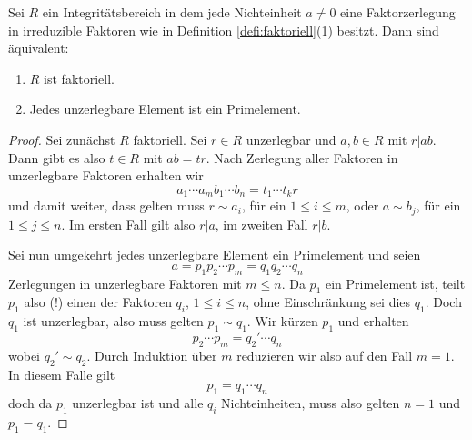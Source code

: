 \documentclass{book}
\begin{document}
\begin{prop}
    \label{prop:faktor}
    Sei $R$ ein Integritätsbereich in dem jede Nichteinheit $a \ne 0$ eine
    Faktorzerlegung in irreduzible Faktoren wie in Definition
    \ref{defi:faktoriell}(1) besitzt. Dann sind äquivalent:
    \begin{enumerate}[label=(\roman *)]
        \item $R$ ist faktoriell.
        \item Jedes unzerlegbare Element ist ein Primelement.
    \end{enumerate}
\end{prop}
\begin{proof}
    Sei zunächst $R$ faktoriell. Sei $r \in R$ unzerlegbar und $a,b \in R$ mit
    $r | ab$. Dann gibt es also $t \in R$ mit $ab = t r$. Nach Zerlegung aller
    Faktoren in unzerlegbare Faktoren erhalten wir
    \[
        a_1 \cdots a_m b_1 \cdots b_n = t_1 \cdots t_k r
    \]
    und damit weiter, dass gelten muss $r \sim a_i$, für ein $1 \le i \le m$,
    oder $a \sim b_j$, für ein $1 \le j \le n$. Im ersten Fall gilt also $r | a$, im zweiten Fall $r | b$. 

    Sei nun umgekehrt jedes unzerlegbare Element ein Primelement und seien
    \[
        a = p_1 p_2 \cdots p_m = q_1 q_2 \cdots q_n
    \]
    Zerlegungen in unzerlegbare Faktoren mit $m \le n$. Da $p_1$ ein Primelement ist, teilt
    $p_1$ also (!) einen der Faktoren $q_i$, $1 \le i \le n$, ohne Einschränkung
    sei dies $q_1$. Doch $q_1$ ist unzerlegbar, also muss gelten $p_1 \sim q_1$. Wir kürzen $p_1$ und erhalten
    \[
        p_2 \cdots p_m = q_2' \cdots q_n
    \]
    wobei $q_2' \sim q_2$. Durch Induktion über $m$ reduzieren wir also auf den
    Fall $m=1$. In diesem Falle gilt 
    \[
        p_1 = q_1 \cdots q_n
    \]
    doch da $p_1$ unzerlegbar ist und alle $q_i$ Nichteinheiten, muss also
    gelten $n = 1$ und $p_1 = q_1$.
\end{proof}
\end{document}
